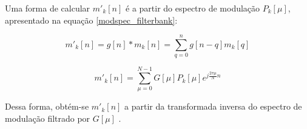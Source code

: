 Uma forma de calcular $m'_k[n]$ é a partir do espectro de modulação $P_k[\mu]$,
apresentado na equação \ref{modspec_filterbank}:

\begin{equation}
    m'_k[n] = g[n] \ast m_k[n] = \sum_{q = 0}^{n} g[n - q] m_k[q]
\end{equation}

\begin{equation}
    m'_k[n] = \sum_{\mu=0}^{N-1} G[\mu]P_k[\mu] e^{j \frac{2 \pi \mu}{N} n}
\end{equation}  

Dessa forma, obtém-se $m'_k[n]$ a partir da transformada inversa do espectro de
modulação filtrado por $G[\mu]$ \cite{toolbox2010}.

